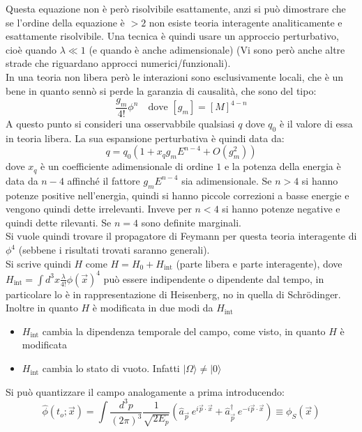 \documentclass[]{article}
\begin{document}
Questa equazione non è però risolvibile esattamente, anzi si può dimostrare che se l'ordine della equazione è $>2$ non esiste teoria interagente analiticamente e esattamente risolvibile. Una tecnica è quindi usare un approccio perturbativo, cioè quando $\lambda \ll 1$ (e quando è anche adimensionale) (Vi sono però anche altre strade che riguardano approcci numerici/funzionali).\\
In una teoria non libera però le interazioni sono esclusivamente locali, che è un bene in quanto sennò si perde la garanzia di causalità, che sono del tipo:
\begin{equation}
 \frac{g_m}{4!}\phi^n \quad \text{dove } [g_m] = [M]^{4-n}
\end{equation}
A questo punto si consideri una osservabbile qualsiasi $q$ dove $q_0$ è il valore di essa in teoria libera. La sua espansione perturbativa è quindi data da:
\begin{equation}
 q = q_0 \left(1 + x_q g_m E^{n-4} + O(g^2_m) \right)
\end{equation}
dove $x_q$ è un coefficiente adimensionale di ordine $1$ e la potenza della energia è data da $n-4$ affinché il fattore $g_m E^{n-4}$ sia adimensionale. Se $n>4$ si hanno potenze positive nell'energia, quindi si hanno piccole correzioni a basse energie e vengono quindi dette irrelevanti. Inveve per $n < 4$ si hanno potenze negative e quindi dette rilevanti. Se $n = 4$ sono definite marginali.
\\
Si vuole quindi trovare il propagatore di Feymann per questa teoria interagente di $\phi ^ 4$ (sebbene i risultati trovati saranno generali).\\
Si scrive quindi $H$ come $H = H_0 + H_\text{int}$ (parte libera e parte interagente), dove $H_\text{int} = \int d^3 x \frac{\lambda}{4!} \phi (\vec x)^4$ può essere indipendente o dipendente dal tempo, in particolare lo è in rappresentazione di Heisenberg, no in quella di Schrödinger. Inoltre in quanto $H$ è modificata in due modi da $H_\text{int}$
\begin{itemize}
 \item $H_\text{int}$ cambia la dipendenza temporale del campo, come visto, in quanto $H$ è modificata
\item $H_\text{int}$ cambia lo stato di vuoto. Infatti $|\Omega\rangle \neq | 0 \rangle $
\end{itemize}
Si può quantizzare il campo analogamente a prima introducendo:
\begin{equation}
 \hat \phi (t_o; \vec x) = \int \frac{d^3 p}{(2 \pi)^3} \frac{1}{\sqrt{2 E_p}} \left( \hat a_{\vec p} \: e^{ i \vec p \cdot \vec x} + \hat a_{\vec p}^\dagger \: e^{-i \vec p \cdot \vec x} \right) \equiv \phi_S(\vec x)
\end{equation}
\end{document}
